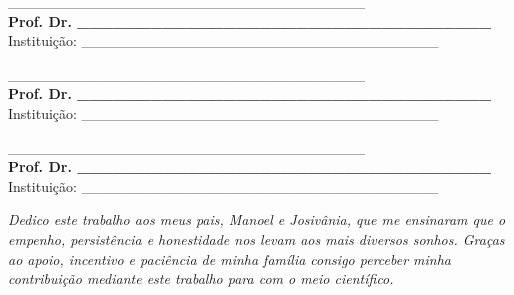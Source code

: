 \begin{folhadeaprovacao}
\begin{center}
\vspace*{2cm}

\_\_\_\_\_\_\_\_\_\_\_\_\_\_\_\_\_\_\_\_\_\_\_\_\_\_\_\_\_\_\_\_\_\_%
\vspace*{0.2cm} 
\\ \textbf{Prof. Dr. \_\_\_\_\_\_\_\_\_\_\_\_\_\_\_\_\_\_\_\_\_\_\_\_\_\_\_\_\_\_\_\_\_\_%
} 
\\ \vspace*{0.2cm} 
Instituição: \_\_\_\_\_\_\_\_\_\_\_\_\_\_\_\_\_\_\_\_\_\_\_\_\_\_\_\_\_\_\_\_\_\_%

\vspace*{2cm}

\_\_\_\_\_\_\_\_\_\_\_\_\_\_\_\_\_\_\_\_\_\_\_\_\_\_\_\_\_\_\_\_\_\_%
\vspace*{0.2cm} 
\\ \textbf{Prof. Dr. \_\_\_\_\_\_\_\_\_\_\_\_\_\_\_\_\_\_\_\_\_\_\_\_\_\_\_\_\_\_\_\_\_\_%
} 
\\ \vspace*{0.2cm} 
Instituição: \_\_\_\_\_\_\_\_\_\_\_\_\_\_\_\_\_\_\_\_\_\_\_\_\_\_\_\_\_\_\_\_\_\_%

\vspace*{2cm}

\_\_\_\_\_\_\_\_\_\_\_\_\_\_\_\_\_\_\_\_\_\_\_\_\_\_\_\_\_\_\_\_\_\_%
\vspace*{0.2cm} 
\\ \textbf{Prof. Dr. \_\_\_\_\_\_\_\_\_\_\_\_\_\_\_\_\_\_\_\_\_\_\_\_\_\_\_\_\_\_\_\_\_\_%
} 
\\ \vspace*{0.2cm} 
Instituição: \_\_\_\_\_\_\_\_\_\_\_\_\_\_\_\_\_\_\_\_\_\_\_\_\_\_\_\_\_\_\_\_\_\_%

\end{center}
  
\end{folhadeaprovacao}






\begin{dedicatoria}
   \vspace*{\fill}
   \centering
   \noindent
   \textit{Dedico este trabalho aos meus pais, Manoel e Josivânia, que me ensinaram que o empenho, persistência e honestidade nos levam aos mais diversos sonhos. Graças ao apoio, incentivo e paciência de minha família consigo perceber minha contribuição mediante este trabalho para com o meio científico.} 
	 \vspace*{\fill}
\end{dedicatoria}



